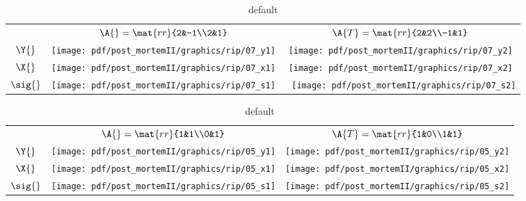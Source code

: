 \begin{table}[htdp]
\begin{center}
\begin{tabular}{ccc}
 & $\A{}=\mat{rr}{2&-1\\2&1}$ & $\A{T} = \mat{rr}{2&2\\-1&1} $ \\[35pt]
 $\Y{}$   & \qquad \texttt{[image: pdf/post\_mortemII/graphics/rip/07\_y1]} 
          & \qquad \texttt{[image: pdf/post\_mortemII/graphics/rip/07\_y2]} \\[15pt]
 $\X{}$   & \qquad \texttt{[image: pdf/post\_mortemII/graphics/rip/07\_x1]}
          & \qquad \texttt{[image: pdf/post\_mortemII/graphics/rip/07\_x2]} \\[20pt]
 $\sig{}$ & \quad  \texttt{[image: pdf/post\_mortemII/graphics/rip/07\_s1]}
          & \,\    \texttt{[image: pdf/post\_mortemII/graphics/rip/07\_s2]} \\[20pt]
\end{tabular}
\end{center}
\label{tab:pmII:visualsg}
\caption{default}
\end{table}%
\clearpage

\begin{table}[htdp]
\begin{center}
\begin{tabular}{ccc}
 & $\A{}=\mat{rr}{1&1\\0&1}$ & $\A{T} = \mat{rr}{1&0\\1&1} $ \\[35pt]
 $\Y{}$   & \qquad \texttt{[image: pdf/post\_mortemII/graphics/rip/05\_y1]} 
          & \qquad \texttt{[image: pdf/post\_mortemII/graphics/rip/05\_y2]} \\[15pt]
 $\X{}$   & \qquad \texttt{[image: pdf/post\_mortemII/graphics/rip/05\_x1]}
          & \qquad \texttt{[image: pdf/post\_mortemII/graphics/rip/05\_x2]} \\[20pt]
 $\sig{}$ &        \texttt{[image: pdf/post\_mortemII/graphics/rip/05\_s1]}
          &        \texttt{[image: pdf/post\_mortemII/graphics/rip/05\_s2]} \\[20pt]
\end{tabular}
\end{center}
\label{tab:pmII:visualsh}
\caption{default}
\end{table}%
\clearpage

